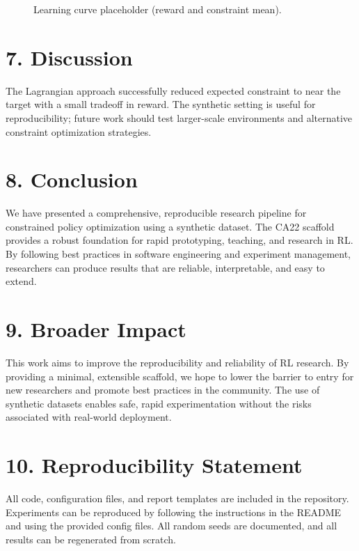 \documentclass[conference]{IEEEtran}
\begin{document}
\begin{figure}[ht]
  \centering
  \caption{Learning curve placeholder (reward and constraint mean).}
  \label{fig:learning_curve}
\end{figure}

\section*{7. Discussion}
The Lagrangian approach successfully reduced expected constraint to near the target with a small tradeoff in reward. The synthetic setting is useful for reproducibility; future work should test larger-scale environments and alternative constraint optimization strategies.

\section*{8. Conclusion}
We have presented a comprehensive, reproducible research pipeline for constrained policy optimization using a synthetic dataset. The CA22 scaffold provides a robust foundation for rapid prototyping, teaching, and research in RL. By following best practices in software engineering and experiment management, researchers can produce results that are reliable, interpretable, and easy to extend.

\section*{9. Broader Impact}
This work aims to improve the reproducibility and reliability of RL research. By providing a minimal, extensible scaffold, we hope to lower the barrier to entry for new researchers and promote best practices in the community. The use of synthetic datasets enables safe, rapid experimentation without the risks associated with real-world deployment.

\section*{10. Reproducibility Statement}
All code, configuration files, and report templates are included in the repository. Experiments can be reproduced by following the instructions in the README and using the provided config files. All random seeds are documented, and all results can be regenerated from scratch.
\end{document}
